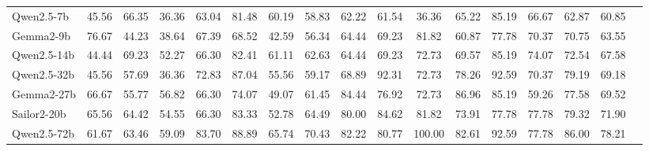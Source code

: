 \begin{table}[ht]
{\begin{tabular}{l *{16}{c}}
Qwen2.5-7b & 45.56 & 66.35 & 36.36 & 63.04 & 81.48 & 60.19 & 58.83 & 62.22 & 61.54 & 36.36 & 65.22 & 85.19 & 66.67 & 62.87 & 60.85 \\ %
Gemma2-9b & 76.67 & 44.23 & 38.64 & 67.39 & 68.52 & 42.59 & 56.34 & 64.44 & 69.23 & 81.82 & 60.87 & 77.78 & 70.37 & 70.75 & 63.55 \\ %
Qwen2.5-14b & 44.44 & 69.23 & 52.27 & 66.30 & 82.41 & 61.11 & 62.63 & 64.44 & 69.23 & 72.73 & 69.57 & 85.19 & 74.07 & 72.54 & 67.58 \\ %
Qwen2.5-32b & 45.56 & 57.69 & 36.36 & 72.83 & 87.04 & 55.56 & 59.17 & 68.89 & 92.31 & 72.73 & 78.26 & 92.59 & 70.37 & 79.19 & 69.18 \\ %
Gemma2-27b & 66.67 & 55.77 & 56.82 & 66.30 & 74.07 & 49.07 & 61.45 & 84.44 & 76.92 & 72.73 & 86.96 & 85.19 & 59.26 & 77.58 & 69.52 \\ %
Sailor2-20b & 65.56 & 64.42 & 54.55 & 66.30 & 83.33 & 52.78 & 64.49 & 80.00 & 84.62 & 81.82 & 73.91 & 77.78 & 77.78 & 79.32 & 71.90 \\ %
Qwen2.5-72b & 61.67 & 63.46 & 59.09 & 83.70 & 88.89 & 65.74 & 70.43 & 82.22 & 80.77 & 100.00 & 82.61 & 92.59 & 77.78 & 86.00 & 78.21 \\ %
\bottomrule
\end{tabular}
}
\end{table}



